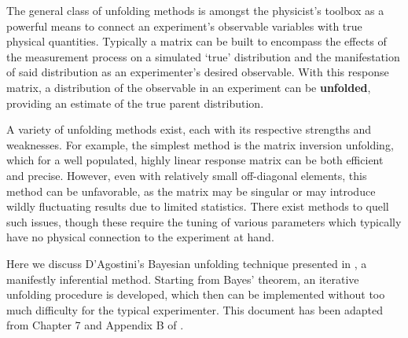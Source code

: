 The general class of unfolding methods is amongst the physicist's toolbox as a powerful 
means to connect an experiment's observable variables with true physical quantities.
Typically a matrix can be built to encompass the effects of the measurement process
on a simulated `true' distribution and the manifestation of said distribution as an 
experimenter's desired observable. With this response matrix, a distribution of 
the observable in an experiment can be \textbf{unfolded}, providing an estimate of the 
true parent distribution.

A variety of unfolding methods exist, each with its respective strengths and weaknesses.
For example, the simplest method is the matrix inversion unfolding, which for a well 
populated, highly linear response matrix can be both efficient and precise.
However, even with relatively small off-diagonal elements, this method can be unfavorable,
as the matrix may be singular or may introduce wildly fluctuating results due to limited 
statistics. There exist methods to quell such issues, though these require the tuning
of various parameters which typically have no physical connection to the experiment at hand.

Here we discuss D'Agostini's Bayesian unfolding technique presented in \cite{agostini}, 
a manifestly inferential method.
Starting from Bayes' theorem, an iterative unfolding procedure is developed, 
which then can be implemented without too much difficulty for the typical experimenter.
This document has been adapted from Chapter 7 and Appendix B of \cite{zhampel-thesis}.
